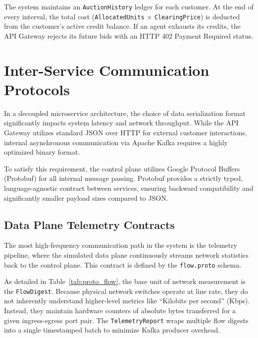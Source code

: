 The system maintains an \texttt{AuctionHistory} ledger for each customer. At the end of every interval, the total cost (\texttt{AllocatedUnits} $\times$ \texttt{ClearingPrice}) is deducted from the customer's active credit balance. If an agent exhausts its credits, the API Gateway rejects its future bids with an HTTP 402 Payment Required status.

\section{Inter-Service Communication Protocols}

In a decoupled microservice architecture, the choice of data serialization format significantly impacts system latency and network throughput. While the API Gateway utilizes standard JSON over HTTP for external customer interactions, internal asynchronous communication via Apache Kafka requires a highly optimized binary format. 

To satisfy this requirement, the control plane utilizes Google Protocol Buffers (Protobuf) for all internal message passing. Protobuf provides a strictly typed, language-agnostic contract between services, ensuring backward compatibility and significantly smaller payload sizes compared to JSON.

\subsection{Data Plane Telemetry Contracts}
The most high-frequency communication path in the system is the telemetry pipeline, where the simulated data plane continuously streams network statistics back to the control plane. This contract is defined by the \texttt{flow.proto} schema. 

As detailed in Table~\ref{tab:proto_flow}, the base unit of network measurement is the \texttt{FlowDigest}. Because physical network switches operate at line rate, they do not inherently understand higher-level metrics like ``Kilobits per second'' (Kbps). Instead, they maintain hardware counters of absolute bytes transferred for a given ingress-egress port pair. The \texttt{TelemetryReport} wraps multiple flow digests into a single timestamped batch to minimize Kafka producer overhead.


